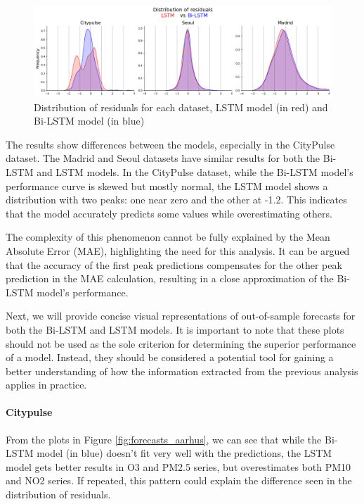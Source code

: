 \begin{figure}
    \centering
    \includegraphics[width=1\linewidth]{images/Residuals_distribution.png}
    \caption{Distribution of residuals for each dataset, LSTM model (in red) and Bi-LSTM model (in blue)}
    \label{fig:kde_residuals}
\end{figure}

The results show differences between the models, especially in the CityPulse dataset. The Madrid and Seoul datasets have similar results for both the Bi-LSTM and LSTM models. In the CityPulse dataset, while the Bi-LSTM model's performance curve is skewed but mostly normal, the LSTM model shows a distribution with two peaks: one near zero and the other at -1.2. This indicates that the model accurately predicts some values while overestimating others.

The complexity of this phenomenon cannot be fully explained by the Mean Absolute Error (MAE), highlighting the need for this analysis. It can be argued that the accuracy of the first peak predictions compensates for the other peak prediction in the MAE calculation, resulting in a close approximation of the Bi-LSTM model's performance.

Next, we will provide concise visual representations of out-of-sample forecasts for both the Bi-LSTM and LSTM models. It is important to note that these plots should not be used as the sole criterion for determining the superior performance of a model. Instead, they should be considered a potential tool for gaining a better understanding of how the information extracted from the previous analysis applies in practice.

\paragraph{Citypulse}
From the plots in Figure \ref{fig:forecasts_aarhus}, we can see that while the Bi-LSTM model (in blue) doesn't fit very well with the predictions, the LSTM model gets better results in O3 and PM2.5 series, but overestimates both PM10 and NO2 series. If repeated, this pattern could explain the difference seen in the distribution of residuals.

